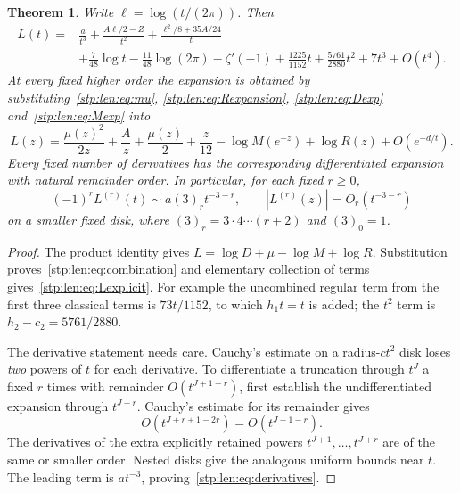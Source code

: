 \documentclass[11pt]{article}
\newtheorem{theorem}{Theorem}[section]
\theoremstyle{remark}\newtheorem{remark}[theorem]{Remark}
\begin{document}
\begin{theorem}\label{stp:len:thm:freeenergy}
Write $\ell=\log(t/(2\pi))$. Then
\begin{equation}\label{stp:len:eq:Lexplicit}
\begin{split}
 L(t)={}&\frac a{t^3}+\frac{A\ell/2-Z}{t^2}
 +\frac{\ell^2/8+35A/24}{t}\\
 &+\frac7{48}\log t-\frac{11}{48}\log(2\pi)-\zeta'(-1)
 +\frac{1225}{1152}t+\frac{5761}{2880}t^2+7t^3+O(t^4).
\end{split}
\end{equation}
At every fixed higher order the expansion is obtained by substituting~\eqref{stp:len:eq:mu}, \eqref{stp:len:eq:Rexpansion}, \eqref{stp:len:eq:Dexp} and~\eqref{stp:len:eq:Mexp} into
\begin{equation}\label{stp:len:eq:combination}
 L(z)=\frac{\mu(z)^2}{2z}+\frac A z+\frac{\mu(z)}2+\frac z{12}
       -\log M(e^{-z})+\log R(z)+O(e^{-d/t}).
\end{equation}
Every fixed number of derivatives has the corresponding differentiated expansion with natural remainder order. In particular, for each fixed $r\ge0$,
\begin{equation}\label{stp:len:eq:derivatives}
 (-1)^rL^{(r)}(t)\sim a(3)_rt^{-3-r},\qquad
 |L^{(r)}(z)|=O_r(t^{-3-r})
\end{equation}
on a smaller fixed disk, where $(3)_r=3\cdot4\cdots(r+2)$ and $(3)_0=1$.
\end{theorem}
\begin{proof}
The product identity gives $L=\log D+\mu-\log M+\log R$. Substitution proves~\eqref{stp:len:eq:combination} and elementary collection of terms gives~\eqref{stp:len:eq:Lexplicit}. For example the uncombined regular term from the first three classical terms is $73t/1152$, to which $h_1t=t$ is added; the $t^2$ term is $h_2-c_2=5761/2880$.

The derivative statement needs care. Cauchy's estimate on a radius-$ct^2$ disk loses \emph{two} powers of $t$ for each derivative. To differentiate a truncation through $t^J$ a fixed $r$ times with remainder $O(t^{J+1-r})$, first establish the undifferentiated expansion through $t^{J+r}$. Cauchy's estimate for its remainder gives
\[
 O(t^{J+r+1-2r})=O(t^{J+1-r}).
\]
The derivatives of the extra explicitly retained powers $t^{J+1},\ldots,t^{J+r}$ are of the same or smaller order. Nested disks give the analogous uniform bounds near $t$. The leading term is $at^{-3}$, proving~\eqref{stp:len:eq:derivatives}.
\end{proof}
\end{document}
